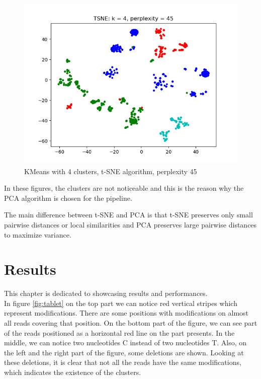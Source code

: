 \documentclass[times, utf8, zavrsni, numeric]{fer}
\begin{document}
\begin{figure}[H]
    \centering
    \includegraphics[width=\linewidth]{figures/tsne_perplexity45}
    \caption{KMeans with 4 clusters, t-SNE algorithm, perplexity 45}
    \label{fig:tsne45}
\end{figure}

In these figures, the clusters are not noticeable and this is the 
reason why the PCA algorithm is chosen for the pipeline. 

The main difference between t-SNE and PCA is that t-SNE preserves only small pairwise
distances or local similarities and PCA preserves large pairwise distances to maximize
variance. 

\chapter{Results}
This chapter is dedicated to showcasing results and performances. \\
In figure \ref{fig:tablet} on the top part we can notice red vertical stripes which 
represent modifications. There are some positions with modifications 
on almost all reads covering that position. On the bottom part of the figure, we can 
see part of the reads positioned as a horizontal red line on the part presents. In the 
middle, we can notice two nucleotides C instead of two nucleotides T. Also, on the left
and the right part of the figure, some deletions are shown. Looking at these deletions, 
it is clear that not all the reads have the same modifications, which indicates the 
existence of the clusters.
\end{document}
